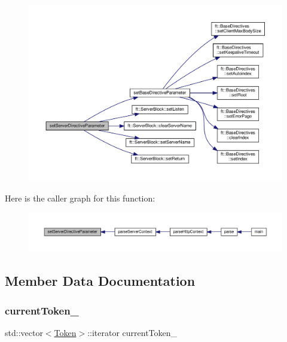 \begin{figure}[H]
\begin{center}
\leavevmode
\includegraphics[width=350pt]{classft_1_1_parser_a18c1b12280ce1a16246a8ba09156116f_cgraph}
\end{center}
\end{figure}
Here is the caller graph for this function\+:
\nopagebreak
\begin{figure}[H]
\begin{center}
\leavevmode
\includegraphics[width=350pt]{classft_1_1_parser_a18c1b12280ce1a16246a8ba09156116f_icgraph}
\end{center}
\end{figure}


\subsection{Member Data Documentation}
\mbox{\label{classft_1_1_parser_a942c5b794d108f144c5b5028aaa34cb6}} 
\subsubsection{\texorpdfstring{current\+Token\+\_\+}{currentToken\_}}
{\footnotesize\ttfamily std\+::vector$<$\hyperlink{classft_1_1_token}{Token}$>$\+::iterator current\+Token\+\_\+\hspace{0.3cm}{\ttfamily [private]}}



